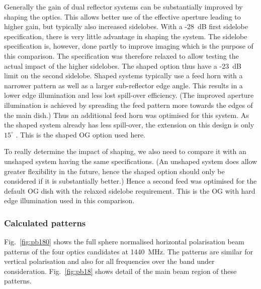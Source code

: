 \documentclass{aa}
\begin{document}
Generally the gain of dual reflector systems can be substantially improved by
shaping the optics.  This allows better use of the effective aperture leading to
higher gain, but typically also increased sidelobes.  With a -28~dB first
sidelobe specification, there is very little advantage in shaping the system.
The sidelobe specification is, however, done partly to improve imaging which is
the purpose of this comparison.  The specification was therefore relaxed to allow
testing the actual impact of the higher sidelobes.  The shaped option thus have
a -23~dB limit on the second sidelobe.  Shaped systems typically use a feed
horn with a narrower pattern as well as a larger sub-reflector edge angle.  This
results in a lower edge illumination and less lost spill-over efficiency.  (The
improved aperture illumination is achieved by spreading the feed pattern more
towards the edges of the main dish.)  Thus an additional feed horn was optimised
for this system.  As the shaped system already has less spill-over, the extension
on this design is only $15^\circ$ \citep{icea-dish-design}.  This is the shaped
OG option used here.

To really determine the impact of shaping, we also need to compare it with an
unshaped system having the same specifications.  (An unshaped system does allow
greater flexibility in the future, hence the shaped option should only be
considered if it is substantially better.) Hence a second feed was optimised for
the default OG dish with the relaxed sidelobe requirement.  This is the OG with
hard edge illumination used in this comparison.


\subsubsection{Calculated patterns}
\label{sec:patterns}

Fig.~\ref{fig:pb180} shows the full sphere normalised horizontal polarisation
beam patterns of the four optics candidates at 1440~MHz.  The patterns are
similar for vertical polarisation and also for all frequencies over the band
under consideration.  Fig.~\ref{fig:pb18} shows detail of the main beam region
of these patterns.
\end{document}
